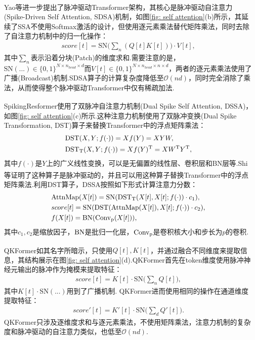\documentclass[10.5pt,compsoc,UTF8]{CjC}
\theoremstyle{mystyle}
\newcommand{\upcite}[1]{\textsuperscript{\cite{#1}}}
\begin{document}
\begin{multicols}{1}
Yao等\upcite{NEURIPS2023_ca0f5358}进一步提出了脉冲驱动Transformer架构，其核心是脉冲驱动自注意力(Spike-Driven Self Attention, SDSA)机制，如图\ref{fig: self attention}(b)所示，其延续了SSA不使用Softmax激活的设计，但使用逐元素乘法替代矩阵乘法，同时去除了自注意力机制中的归一化操作：
\begin{eqnarray}
	score[t] = \text{SN}\Big(\sum_{n}(Q[t]K[t])\Big) \cdot V[t], 
\end{eqnarray}
其中$\sum_{n}$表示沿着分块(Patch)的维度求和.需要注意的是，$\text{SN}(...) \in \{0, 1\}^{N \times n_{head} \times d}$而$V[t]\in \{0, 1\}^{N \times n_{head} \times n \times d}$，两者的逐元素乘法使用了广播(Broadcast)机制.SDSA算子的计算复杂度降低至$\mathcal{O}(nd)$，同时完全消除了乘法，从而使得整个脉冲驱动Transformer中仅有稀疏加法.

SpikingResformer\upcite{Shi_2024_CVPR}使用了双脉冲自注意力机制(Dual Spike Self Attention, DSSA)，如图\ref{fig: self attention}(c)所示.这种注意力机制使用了双脉冲变换(Dual Spike Transformation, DST)算子来替换Transformer中的浮点矩阵乘法：
\begin{align}
	&{\rm DST}(X, Y; f(\cdot))=Xf(Y)=XYW,\\
	&{\rm DST_T}(X, Y; f(\cdot))=Xf(Y)^{\rm T}=XW^{\rm T}Y^{\rm T},
\end{align}
其中$f(\cdot)$是$Y$上的广义线性变换，可以是无偏置的线性层、卷积层和BN层等.Shi等\upcite{Shi_2024_CVPR}证明了这种算子是脉冲驱动的，并且可以用这种算子替换Transformer中的浮点矩阵乘法.利用DST算子，DSSA按照如下形式计算注意力分数：
\begin{align}
	&{\rm AttnMap}(X[t])={\rm SN}({\rm DST_T}(X[t], X[t];f(\cdot)) \cdot c_1),\\
	&score[t]={\rm SN}({\rm DST}({\rm AttnMap}(X[t]),X[t];f(\cdot)) \cdot c_2),\\
	&f(X[t])={\rm BN}({\rm Conv_p}(X[t])),
\end{align}
其中$c_1, c_2$是缩放因子，${\rm BN}$是批归一化层，${\rm Conv_p}$是卷积核大小和步长为$p$的卷积.

QKFormer\upcite{zhou2024qkformerhierarchicalspikingtransformer}如其名字所暗示，只使用$Q[t], K[t]$，并通过融合不同维度来提取信息，其结构展示在图\ref{fig: self attention}(d).QKFormer首先在token维度使用脉冲神经元输出的脉冲作为掩模来提取特征：
\begin{eqnarray}
	score[t] = K[t] \cdot \text{SN}\Big(\sum_{n}{Q[t]}\Big),
\end{eqnarray}
其中$K[t] \cdot \text{SN}(...)$用到了广播机制.
QKFormer进而使用相同的操作在通道维度提取特征：
\begin{eqnarray}
	score'[t] = K'[t] \cdot \text{SN}\Big(\sum_{d}{Q'[t]}\Big).
\end{eqnarray}
QKFormer只涉及逐维度求和与逐元素乘法，不使用矩阵乘法，注意力机制的复杂度和脉冲驱动的自注意力类似，也低至$\mathcal{O}(nd)$.


\end{multicols}
\end{document}

